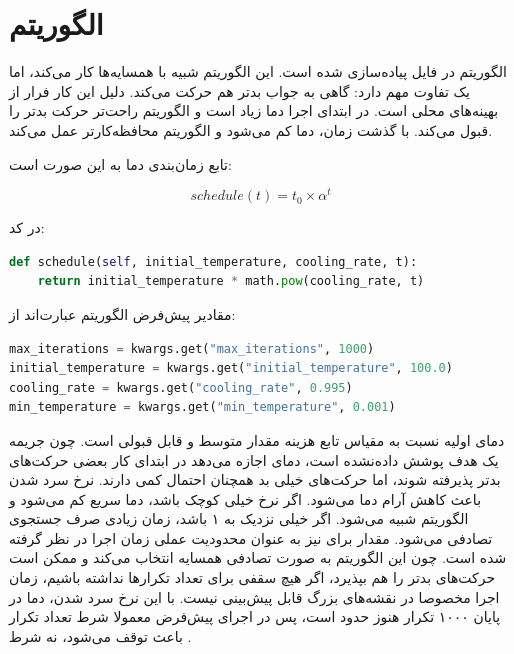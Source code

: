 \documentclass[10.5pt]{exam}
\begin{document}
\section{الگوریتم }
الگوریتم 
در فایل
پیاده‌سازی شده است. این الگوریتم شبیه
با همسایه‌ها کار می‌کند، اما یک تفاوت مهم دارد: گاهی به جواب بدتر هم حرکت می‌کند. دلیل این کار فرار از بهینه‌های محلی است. در ابتدای اجرا دما زیاد است و الگوریتم راحت‌تر حرکت بدتر را قبول می‌کند. با گذشت زمان، دما کم می‌شود و الگوریتم محافظه‌کارتر عمل می‌کند.

تابع زمان‌بندی دما به این صورت است:

\[
    schedule(t) = t_0 \times \alpha^t
\]

در کد:

\begin{latin}
\begin{lstlisting}[language=Python]
def schedule(self, initial_temperature, cooling_rate, t):
    return initial_temperature * math.pow(cooling_rate, t)
\end{lstlisting}
\end{latin}

مقادیر پیش‌فرض الگوریتم عبارت‌اند از:

\begin{latin}
\begin{lstlisting}[language=Python]
max_iterations = kwargs.get("max_iterations", 1000)
initial_temperature = kwargs.get("initial_temperature", 100.0)
cooling_rate = kwargs.get("cooling_rate", 0.995)
min_temperature = kwargs.get("min_temperature", 0.001)
\end{lstlisting}
\end{latin}

دمای اولیه
نسبت به مقیاس تابع هزینه مقدار متوسط و قابل قبولی است. چون جریمه یک هدف پوشش داده‌نشده
است، دمای
اجازه می‌دهد در ابتدای کار بعضی حرکت‌های بدتر پذیرفته شوند، اما حرکت‌های خیلی بد همچنان احتمال کمی دارند.
نرخ سرد شدن
باعث کاهش آرام دما می‌شود. اگر نرخ خیلی کوچک باشد، دما سریع کم می‌شود و الگوریتم شبیه
می‌شود. اگر خیلی نزدیک به ۱ باشد، زمان زیادی صرف جستجوی تصادفی می‌شود. مقدار
برای
نیز به عنوان محدودیت عملی زمان اجرا در نظر گرفته شده است. چون این الگوریتم به صورت تصادفی همسایه انتخاب می‌کند و ممکن است حرکت‌های بدتر را هم بپذیرد، اگر هیچ سقفی برای تعداد تکرارها نداشته باشیم، زمان اجرا مخصوصا در نقشه‌های بزرگ قابل پیش‌بینی نیست. با این نرخ سرد شدن، دما در پایان ۱۰۰۰ تکرار هنوز حدود
است، پس در اجرای پیش‌فرض معمولا شرط تعداد تکرار باعث توقف می‌شود، نه شرط
.
\end{document}
